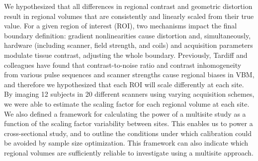 We hypothesized that all differences in regional contrast and geometric distortion result in regional volumes that are consistently and linearly scaled from their true value. For a given region of interest (ROI), two mechanisms impact the final boundary definition: gradient nonlinearities cause distortion and, simultaneously, hardware  (including scanner, field strength, and coils) and acquisition parameters modulate tissue contrast, adjusting the whole boundary. Previously, Tardiff and colleagues have found that contrast-to-noise ratio and contrast inhomogeneity from various pulse sequences and scanner strengths cause regional biases in VBM\cite{tardif2010regional, tardif2009sensitivity}, and therefore we hypothesized that each ROI will scale differently at each site. By imaging 12 subjects in 20 different scanners using varying acquisition schemes, we were able to estimate the scaling factor for each regional volume at each site. We also defined a framework for calculating the power of a multisite study as a function of the scaling factor variability between sites. This enables us to power a cross-sectional study, and to outline the conditions under which calibration could be avoided by sample size optimization. This framework can also indicate which regional volumes are sufficiently reliable to investigate using a multisite approach.